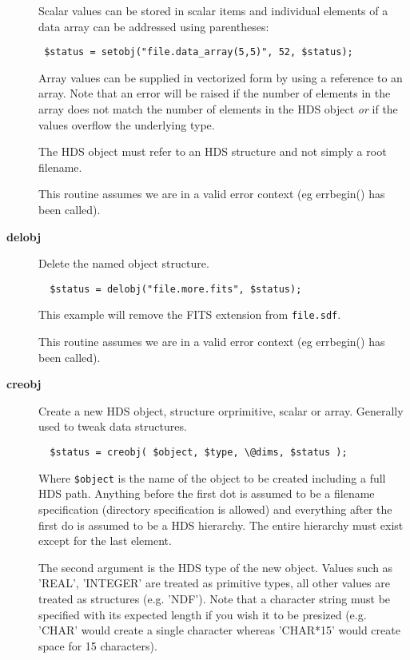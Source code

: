 \documentclass[twoside,11pt]{article}
\renewcommand{\_}{\texttt{\symbol{95}}}
\begin{document}
\begin{description}
Scalar values can be stored in scalar items and individual
elements of a data array can be addressed using parentheses:

\begin{verbatim}
 $status = setobj("file.data_array(5,5)", 52, $status);
\end{verbatim}


Array values can be supplied in vectorized form by using a reference
to an array. Note that an error will be raised if the number of
elements in the array does not match the number of elements in the HDS
object \textit{or} if the values overflow the underlying type.



The HDS object must refer to an HDS structure and not simply a root filename.



This routine assumes we are in a valid error context (eg err\_begin()
has been called).


\item[\textbf{delobj}] \mbox{}

Delete the named object structure.

\begin{verbatim}
  $status = delobj("file.more.fits", $status);
\end{verbatim}


This example will remove the FITS extension from \texttt{file.sdf}.



This routine assumes we are in a valid error context (eg err\_begin()
has been called).


\item[\textbf{creobj}] \mbox{}

Create a new HDS object, structure orprimitive, scalar or array.
Generally used to tweak data structures.

\begin{verbatim}
  $status = creobj( $object, $type, \@dims, $status );
\end{verbatim}


Where \texttt{\$object} is the name of the object to be created including
a full HDS path. Anything before the first dot is assumed to be
a filename specification (directory specification is allowed) and
everything after the first do is assumed to be a HDS hierarchy.
The entire hierarchy must exist except for the last element.



The second argument is the HDS type of the new object. Values such
as '\_REAL', '\_INTEGER' are treated as primitive types, all other
values are treated as structures (e.g. 'NDF'). Note that a character
string must be specified with its expected length if you wish
it to be presized (e.g. '\_CHAR' would create a single character
whereas '\_CHAR*15' would create space for 15 characters).




\end{description}
\end{document}
